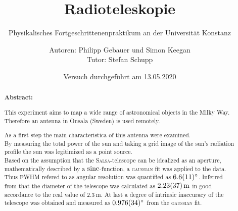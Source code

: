 \title{Radioteleskopie}
\subtitle{Physikalisches Fortgeschrittenenpraktikum an der Universität Konstanz}
\author{Autoren: Philipp Gebauer und Simon Keegan \\ \large{Tutor: Stefan Schupp}}
\date{Versuch durchgeführt am 13.05.2020}
\maketitle
\vspace{2.5 cm}
\begin{abstract}
    \vspace{1cm}
    \noindent \textbf{Abstract:}
    \begin{singlespace}
    This experiment aims to map a wide range of astronomical objects in the Milky Way. Therefore an antenna in Onsala (Sweden) is used remotely.

    As a first step the main characteristica of this antenna were examined.\\
    By measuring the total power of the sun and taking a grid image of the sun's radiation profile the sun was legitimized as a point source. \\
    Based on the assumption that the \textsc{Salsa}-telescope can be idealized as an aperture, mathematically described by a $\operatorname{sinc}$-function, a \textsc{gaussian} fit was applied to the data. Thus FWHM refered to as angular resolution was quantified as $\SI{6.6 \pm 1.1}{\degree}$. Inferred from that the diameter of the telescope was calculated as $\SI{2.23 \pm 0.37}{\metre}$ in good accordance to the real value of $\SI{2.3}{\metre}$. At last a degree of intrinsic inaccuracy of the telescope was obtained and measured as $\SI{0.976 \pm 0.034}{\degree}$ from the \textsc{gaussian} fit.
    \end{singlespace}
\end{abstract}
\thispagestyle{empty}
\newpage